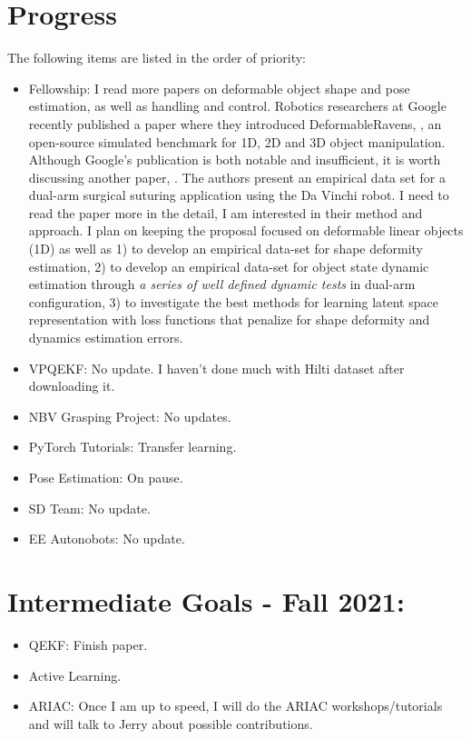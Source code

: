 \documentclass[11pt]{article}
\begin{document}
\section{Progress}
The following items are listed in the order of priority:
\begin{itemize}
      \item Fellowship: I read more papers on deformable object shape and pose estimation, as
      well as handling and control. Robotics researchers at Google recently published a paper where they introduced DeformableRavens, \cite{seita2020learning}, an open-source simulated benchmark for 1D, 2D and 3D object manipulation. Although Google's publication is both notable and insufficient, it is worth discussing another paper, \cite{hashempour2020data}. The authors present an empirical data set for a dual-arm surgical suturing application using the Da Vinchi robot. I need to read the paper more in the detail, I am interested in their method and approach. I plan on keeping the proposal focused on deformable linear objects (1D) as well as 1) to develop an empirical data-set for shape deformity estimation, 2) to develop an empirical data-set for object state dynamic estimation through \textit{a series of well defined dynamic tests} in dual-arm configuration, 3) to investigate the best methods for learning latent space representation with loss functions that penalize for shape deformity and dynamics estimation errors.
      \item VPQEKF: No update. I haven't done much with Hilti dataset after downloading it.
      \item NBV Grasping Project: No updates.
      \item PyTorch Tutorials: Transfer learning.
      \item Pose Estimation: On pause.
      \item SD Team: No update.
      \item EE Autonobots: No update.
\end{itemize}


\section{Intermediate Goals - Fall 2021:}
\begin{itemize}
      \item QEKF: Finish paper.
      \item Active Learning.
      \item ARIAC: Once I am up to speed, I will do the ARIAC workshops/tutorials and will talk to Jerry about possible contributions.
\end{itemize}


\newpage


\end{document}
